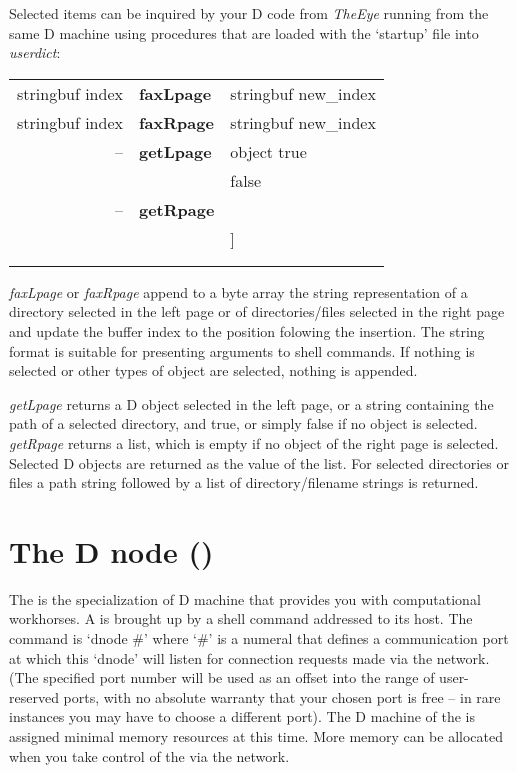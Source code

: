 \begin{description}
Selected items can be inquired by your D code from \emph{TheEye} running from the same D machine using procedures that are loaded with the `startup' file into \emph{userdict}:\\

\begin{tabular}{>{\sffamily}r>{\sffamily\bfseries}l>{\sffamily}l}
stringbuf index & faxLpage & stringbuf new\_index\\
stringbuf index & faxRpage & stringbuf new\_index\\
-- & getLpage & object true\\
   &          & false\\
-- & getRpage & [ D\_object\ldots ]\\
   &          & [ (path) [ (dir/filename)\ldots ]]\\
   &          & [ ]\\\\
\end{tabular}


\emph{faxLpage} or \emph{faxRpage} append to a byte array the string representation of a directory selected in the left page or of directories/files selected in the right page and update the buffer index to the position folowing the insertion. The string format is suitable for presenting arguments to shell commands. If nothing is selected or other types of object are selected, nothing is appended.

\emph{getLpage} returns a D object selected in the left page, or a string containing the path of a selected directory, and true, or simply false if no object is selected. \emph{getRpage} returns a list, which is empty if no object of the right page is selected. Selected D objects are returned as the value of the list. For selected directories or files a path string followed by a list of directory/filename strings is returned. 


 

\end{description}



\section{The D node ()}\label{sec:dnode}

The  is the specialization of D machine that provides you with computational workhorses. A  is brought up by a shell command addressed to its host. The command is `dnode \#' where `\#' is a numeral that defines a communication port at which this `dnode' will listen for connection requests made via the network. (The specified port number will be used as an offset into the range of user-reserved ports, with no absolute warranty that your chosen port is free -- in rare instances you may have to choose a different port). The D machine of the  is assigned minimal memory resources at this time. More memory can be allocated when you take control of the  via the network.

